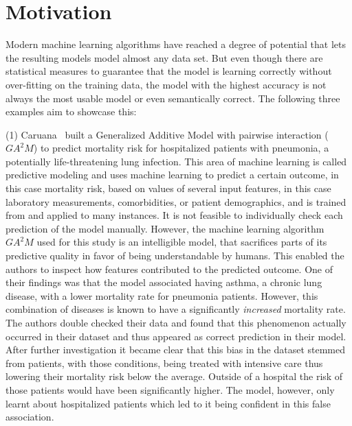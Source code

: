 \section{Motivation}
Modern machine learning algorithms have reached a degree of potential that lets the resulting models model almost any data set.
But even though there are statistical measures to guarantee that the model is learning correctly without over-fitting on the training data, the model with the highest accuracy is not always the most usable model or even semantically correct.
The following three examples aim to showcase this:

\par \noindent (1)
Caruana~\etal\cite{Caruana:2015:IMH:2783258.2788613} built a Generalized Additive Model with pairwise interaction ($GA^2M$) to predict mortality risk for hospitalized patients with pneumonia, a potentially life-threatening lung infection. This area of machine learning is called predictive modeling and uses machine learning to predict a certain outcome, in this case mortality risk, based on values of several input features, in this case laboratory measurements, comorbidities, or patient demographics, and is trained from and applied to many instances. It is not feasible to individually check each prediction of the model manually. However, the machine learning algorithm $GA^2M$ used for this study is an intelligible model, that sacrifices parts of its predictive quality in favor of being understandable by humans. This enabled the authors to inspect how features contributed to the predicted outcome. One of their findings was that the model associated having asthma, a chronic lung disease, with a lower mortality rate for pneumonia patients. However, this combination of diseases is known to have a significantly \emph{increased} mortality rate. The authors double checked their data and found that this phenomenon actually occurred in their dataset and thus appeared as correct prediction in their model. After further investigation it became clear that this bias in the dataset stemmed from patients, with those conditions, being treated with intensive care thus lowering their mortality risk below the average. Outside of a hospital the risk of those patients would have been significantly higher. The model, however, only learnt about hospitalized patients which led to it being confident in this false association.

